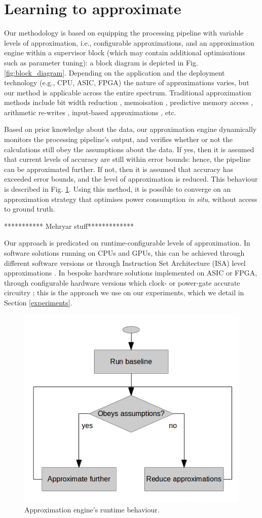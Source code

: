 \section{Learning to approximate}\label{learning}

Our methodology is based on equipping the processing pipeline with variable levels of approximation, i.e., configurable approximations, and an approximation engine within a supervisor block (which may contain additional optimisations such as parameter tuning): a block diagram is depicted in Fig. \ref{fig:block_diagram}. Depending on the application and the deployment technology (e.g., CPU, ASIC, FPGA) the nature of approximations varies, but our method is applicable across the entire spectrum. Traditional approximation methods include bit width reduction \cite{mittal2016survey}, memoisation \cite{sinha2016low}, predictive memory access \cite{yazdanbakhsh2016mitigating}, arithmetic re-writes \cite{nepal2016automated}, input-based approximations \cite{raha2016input}, etc.
\par Based on prior knowledge about the data, our approximation engine dynamically monitors the processing pipeline's output, and verifies whether or not the calculations still obey the assumptions about the data. If yes, then it is assumed that current levels of accuracy are still within error bounds: hence, the pipeline can be approximated further. If not, then it is assumed that accuracy has exceeded error bounds, and the level of approximation is reduced. This behaviour is described in Fig. \ref{fig:flowchart}. Using this method, it is possible to converge on an approximation strategy that optimises power consumption \textit{in situ}, without access to ground truth. 
	 \par ************ Mehryar stuff************* 
\par Our approach is predicated on runtime-configurable levels of approximation. In software solutions running on CPUs and GPUs, this can be achieved through different software versions \cite{vassiliadis2015programming} or through Instruction Set Architecture (ISA) level approximations \cite{venkataramani2013quality}. In bespoke hardware solutions implemented on ASIC or FPGA, through configurable hardware versions which clock- or power-gate accurate circuitry \cite{chan2013statistical}; this is the approach we use on our experiments, which we detail in Section \ref{experiments}.

\begin{figure}[tb]
  \centering
  \includegraphics[width=0.7\columnwidth]{img/flowchart.png}
  \caption{Approximation engine's runtime behaviour.}
  \label{fig:flowchart}
\end{figure}
